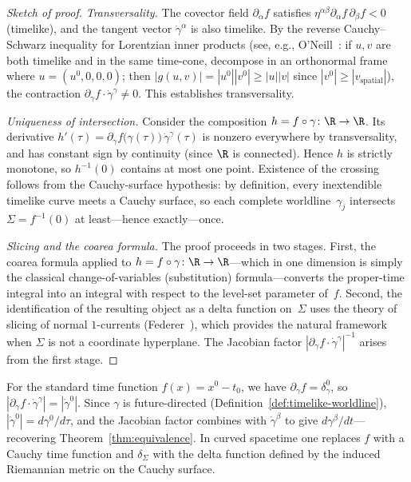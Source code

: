 \begin{proof}[Sketch of proof]
  \emph{Transversality.}\enspace
  The covector field $\partial_\alpha f$ satisfies
  $\eta^{\alpha\beta}\partial_\alpha f\,\partial_\beta f < 0$
  (timelike), and the tangent vector $\dot\gamma^\alpha$ is also
  timelike.  By the reverse Cauchy--Schwarz inequality for
  Lorentzian inner products (see, e.g.,
  O'Neill~\cite[Prop.~5.30]{ONeill83}: if $u,v$ are both
  timelike and in the same time-cone, decompose in an orthonormal
  frame where $u = (u^0,0,0,0)$; then
  $|g(u,v)| = |u^0||v^0| \ge |u||v|$ since
  $|v^0| \ge |v_{\text{spatial}}|$), the contraction
  $\partial_\gamma f \cdot \dot\gamma^\gamma \neq 0$.  This
  establishes transversality.

  \emph{Uniqueness of intersection.}\enspace
  Consider the composition $h = f\circ\gamma\colon\R\to\R$.
  Its derivative $h'(\tau) = \partial_\gamma f\bigl(\gamma(\tau)\bigr)
  \,\dot\gamma^\gamma(\tau)$ is nonzero everywhere by
  transversality, and has constant sign by continuity (since
  $\R$ is connected).  Hence $h$ is strictly monotone, so
  $h^{-1}(0)$ contains at most one point.  Existence of the
  crossing follows from the Cauchy-surface hypothesis: by
  definition, every inextendible timelike curve meets a Cauchy
  surface, so each complete worldline~$\gamma_j$ intersects
  $\Sigma = f^{-1}(0)$ at least---hence exactly---once.

  \emph{Slicing and the coarea formula.}\enspace
  The proof proceeds in two stages.  First, the coarea formula
  applied to $h = f\circ\gamma\colon\R\to\R$---which in one
  dimension is simply the classical change-of-variables
  (substitution) formula---converts the proper-time integral into
  an integral with respect to the level-set parameter of~$f$.
  Second, the identification of the resulting object as a delta
  function on~$\Sigma$ uses the theory of slicing of normal
  $1$-currents (Federer~\cite[Theorem~4.3.2]{Federer69}), which
  provides the natural framework when $\Sigma$ is not a
  coordinate hyperplane.  The Jacobian factor
  $|\partial_\gamma f \cdot \dot\gamma^\gamma|^{-1}$ arises from
  the first stage.
\end{proof}

\begin{remark}
  For the standard time function $f(x) = x^0 - t_0$, we have
  $\partial_\gamma f = \delta_\gamma^0$, so
  $|\partial_\gamma f\cdot\dot\gamma^\gamma| = |\dot\gamma^0|$.
  Since $\gamma$ is future-directed
  (Definition~\ref{def:timelike-worldline}),
  $|\dot\gamma^0| = d\gamma^0/d\tau$, and the Jacobian factor
  combines with $\dot\gamma^\beta$ to give
  $d\gamma^\beta/dt$---recovering
  Theorem~\ref{thm:equivalence}.  In curved spacetime one
  replaces $f$ with a Cauchy time function and $\delta_\Sigma$
  with the delta function defined by the induced Riemannian metric
  on the Cauchy surface.
\end{remark}
